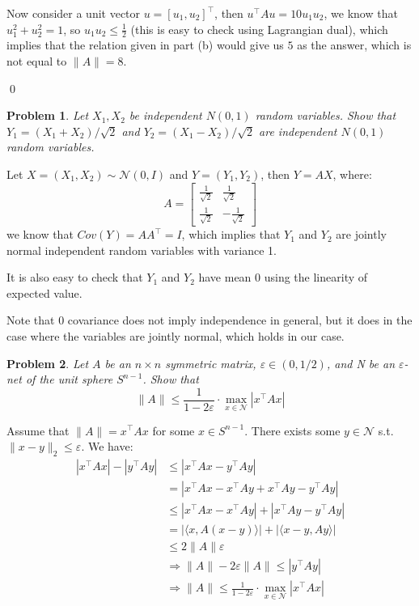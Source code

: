 \documentclass[12pt]{article}
\newtheorem{ex}{Problem}
\begin{document}
\begin{bx}
\begin{enumerate}[label=(\alph*)]
Now consider a unit vector $u=[u_1,u_2]^\top$, then $u^\top A u=10u_1u_2$, we know that $u_1^2+u_2^2=1$, so $u_1u_2\le\frac{1}{2}$ (this is easy to check using  Lagrangian dual), which implies that the relation given in part (b) would give us $5$ as the answer, which is not equal to $\|A\|=8$.
	\end{enumerate}
\qed
	\end{bx}
	
		\begin{bx}
		
		\begin{ex}
			Let $X_1,X_2$ be independent $N(0,1)$ random
			variables. Show that $Y_1=(X_1+X_2)/\sqrt{2}$ and $Y_2=(X_1-X_2)/\sqrt{2}$ are independent $N(0,1)$ random variables.
		\end{ex}

		\tcblower
	Let $X=(X_1,X_2)\sim \mathcal{N}(0,I)$ and $Y=(Y_1,Y_2)$, then $Y=AX$, where:
	\[
	A =
	\begin{bmatrix}
		\frac{1}{\sqrt{2}} & 	\frac{1}{\sqrt{2}} \\
			\frac{1}{\sqrt{2}} & 	-\frac{1}{\sqrt{2}}
	\end{bmatrix}
	\]	
	we know that $Cov(Y)=AA^\top=I$, which implies that $Y_1$ and $Y_2$ are jointly normal independent random variables with variance 1.
	
	It is also easy to check that $Y_1$ and $Y_2$ have mean 0 using the linearity of expected value. 
	
	Note that 0 covariance does not imply independence in general, but it does in the case where the variables are jointly normal, which holds in our case.
	\end{bx}

	
\begin{bx}
	
	\begin{ex}
	Let $A$ be an $n \times n$ symmetric matrix, $\varepsilon \in (0,1/2)$, and N be an $\varepsilon$-net of the unit sphere	$S^{n-1}$. Show that
	\[
	\|A\|\le\frac{1}{1-2\varepsilon}\cdot\max\limits_{x\in\mathcal{N}}|x^\top Ax|
	\]
	\end{ex}
	\tcblower
	Assume that $\|A\|=x^\top A x$ for some $x \in S^{n-1}$. There exists some $y\in\mathcal{N}$ s.t. $\|x-y\|_2\le \varepsilon$. We have:
	\begin{align*}
		|x^\top Ax|-|y^\top Ay| &\le |x^\top Ax-y^\top Ay|\\
		&= |x^\top Ax - x^\top Ay + x^\top Ay-y^\top Ay| \\
		&\le  |x^\top Ax - x^\top Ay| + |x^\top Ay-y^\top Ay| \\
		&= |\langle x, A(x-y)\rangle| +  |\langle x-y,Ay\rangle| \\
		&\le 2\|A\|\varepsilon \\
		&\Rightarrow \|A\|-2\varepsilon\|A\| \le |y^\top A y| \\
		&\Rightarrow \|A\| \le \frac{1}{1-2\varepsilon}\cdot\max\limits_{x\in \mathcal{N}}|x^\top A x|
	\end{align*}

\end{bx}
\end{document}
